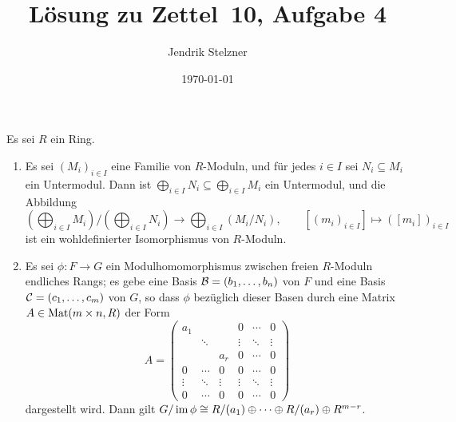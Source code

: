 \documentclass[a4paper,10pt,numbers=noenddot]{scrartcl}
\title{Lösung zu Zettel~10, Aufgabe 4}
\author{Jendrik Stelzner}
\date{\today}
\begin{document}
\maketitle





\begin{lemma}
  \label{lemma: quotients via diagonal matrices}
  Es sei $R$ ein Ring.
  \begin{enumerate}
    \item
      Es sei $(M_i)_{i \in I}$ eine Familie von $R$-Moduln, und für jedes $i \in I$ sei $N_i \subseteq M_i$ ein Untermodul.
      Dann ist $\bigoplus_{i \in I} N_i \subseteq \bigoplus_{i \in I} M_i$ ein Untermodul, und die Abbildung
      \[
            \left( \bigoplus_{i \in I} M_i \right) / \left( \bigoplus_{i \in I} N_i \right)
        \to \bigoplus_{i \in I} (M_i / N_i),
        \qquad
        [(m_i)_{i \in I}] \mapsto ([m_i])_{i \in I}
      \]
      ist ein wohldefinierter Isomorphismus von $R$-Moduln.
    \item
      Es sei $\phi \colon F \to G$ ein Modulhomomorphismus zwischen freien $R$-Moduln endliches Rangs;
      es gebe eine Basis $\mathcal{B} = (b_1, \dotsc, b_n)$ von $F$ und eine Basis $\mathcal{C} = (c_1, \dotsc, c_m)$ von $G$, so dass $\phi$ bezüglich dieser Basen durch eine Matrix $A \in \operatorname{Mat}(m \times n, R)$ der Form
      \[
          A
        = \begin{pmatrix}
            a_1     &         &         & 0       & \cdots  & 0       \\
                    & \ddots  &         & \vdots  & \ddots  & \vdots  \\
                    &         & a_r     & 0       & \cdots  & 0       \\
            0       & \cdots  & 0       & 0       & \cdots  & 0       \\
            \vdots  & \ddots  & \vdots  & \vdots  & \ddots  & \vdots  \\
            0       & \cdots  & 0       & 0       & \cdots  & 0
          \end{pmatrix}
      \]
      dargestellt wird.
      Dann gilt $G / \operatorname{im} \phi \cong R/(a_1) \oplus \dotsb \oplus R/(a_r) \oplus R^{m-r}$.
  \end{enumerate}
\end{lemma}
\end{document}

